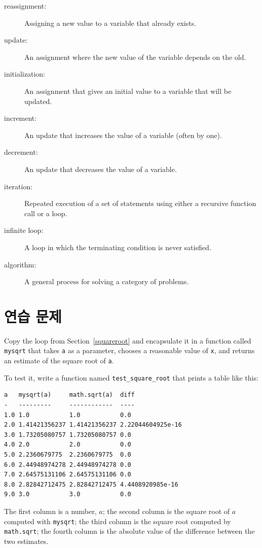 \documentclass[10pt]{book}
\begin{document}
\begin{description}

\item[reassignment:] Assigning a new value to a variable that
already exists.

\item[update:] An assignment where the new value of the variable
depends on the old.

\item[initialization:] An assignment that gives an initial value to
a variable that will be updated.

\item[increment:] An update that increases the value of a variable
(often by one).

\item[decrement:] An update that decreases the value of a variable.

\item[iteration:] Repeated execution of a set of statements using
either a recursive function call or a loop.

\item[infinite loop:] A loop in which the terminating condition is
never satisfied.

\item[algorithm:]  A general process for solving a category of
problems.

\end{description}


\section{연습 문제}

\begin{exercise}

Copy the loop from Section~\ref{squareroot}
and encapsulate it in a function called
\verb"mysqrt" that takes {\tt a} as a parameter, chooses a
reasonable value of {\tt x}, and returns an estimate of the square
root of {\tt a}.  

To test it, write a function named \verb"test_square_root"
that prints a table like this:

\begin{verbatim}
a   mysqrt(a)     math.sqrt(a)  diff
-   ---------     ------------  ----
1.0 1.0           1.0           0.0
2.0 1.41421356237 1.41421356237 2.22044604925e-16
3.0 1.73205080757 1.73205080757 0.0
4.0 2.0           2.0           0.0
5.0 2.2360679775  2.2360679775  0.0
6.0 2.44948974278 2.44948974278 0.0
7.0 2.64575131106 2.64575131106 0.0
8.0 2.82842712475 2.82842712475 4.4408920985e-16
9.0 3.0           3.0           0.0
\end{verbatim}
%
The first column is a number, $a$; the second column is the square
root of $a$ computed with \verb"mysqrt"; the third column is the
square root computed by {\tt math.sqrt}; the fourth column is the
absolute value of the difference between the two estimates.
\end{exercise}
\end{document}
